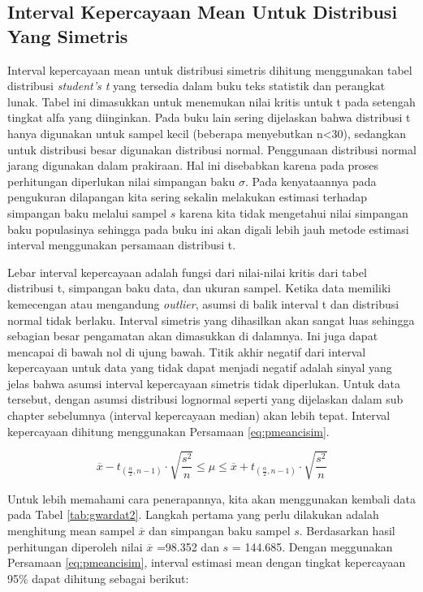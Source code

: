 \documentclass[]{book}
\begin{document}
\subsection{Interval Kepercayaan Mean Untuk Distribusi Yang
Simetris}\label{interval-kepercayaan-mean-untuk-distribusi-yang-simetris}

Interval kepercayaan mean untuk distribusi simetris dihitung menggunakan
tabel distribusi \emph{student's t} yang tersedia dalam buku teks
statistik dan perangkat lunak. Tabel ini dimasukkan untuk menemukan
nilai kritis untuk t pada setengah tingkat alfa yang diinginkan. Pada
buku lain sering dijelaskan bahwa distribusi t hanya digunakan untuk
sampel kecil (beberapa menyebutkan n\textless{}30), sedangkan untuk
distribusi besar digunakan distribusi normal. Penggunaan distribusi
normal jarang digunakan dalam prakiraan. Hal ini disebabkan karena pada
proses perhitungan diperlukan nilai simpangan baku \(\sigma\). Pada
kenyataannya pada pengukuran dilapangan kita sering sekalin melakukan
estimasi terhadap simpangan baku melalui sampel \(s\) karena kita tidak
mengetahui nilai simpangan baku populasinya sehingga pada buku ini akan
digali lebih jauh metode estimasi interval menggunakan persamaan
distribusi t.

Lebar interval kepercayaan adalah fungsi dari nilai-nilai kritis dari
tabel distribusi t, simpangan baku data, dan ukuran sampel. Ketika data
memiliki kemecengan atau mengandung \emph{outlier}, asumsi di balik
interval t dan distribusi normal tidak berlaku. Interval simetris yang
dihasilkan akan sangat luas sehingga sebagian besar pengamatan akan
dimasukkan di dalamnya. Ini juga dapat mencapai di bawah nol di ujung
bawah. Titik akhir negatif dari interval kepercayaan untuk data yang
tidak dapat menjadi negatif adalah sinyal yang jelas bahwa asumsi
interval kepercayaan simetris tidak diperlukan. Untuk data tersebut,
dengan asumsi distribusi lognormal seperti yang dijelaskan dalam sub
chapter sebelumnya (interval kepercayaan median) akan lebih tepat.
Interval kepercayaan dihitung menggunakan Persamaan \eqref{eq:pmeancisim}.

\begin{equation}
  \overline{x}-t_{\left(\frac{\alpha}{2},n-1\right)}\cdot\sqrt{\frac{s^2}{n}}\le\mu\le\overline{x}+t_{\left(\frac{\alpha}{2},n-1\right)}\cdot\sqrt{\frac{s^2}{n}}
  \label{eq:pmeancisim}
\end{equation}

Untuk lebih memahami cara penerapannya, kita akan menggunakan kembali
data pada Tabel \ref{tab:gwardat2}. Langkah pertama yang perlu dilakukan
adalah menghitung mean sampel \(\overline{x}\) dan simpangan baku sampel
\(s\). Berdasarkan hasil perhitungan diperoleh nilai \(\overline{x}\)
=98.352 dan \(s\) = 144.685. Dengan meggunakan Persamaan
\eqref{eq:pmeancisim}, interval estimasi mean dengan tingkat kepercayaan
95\% dapat dihitung sebagai berikut:
\end{document}
